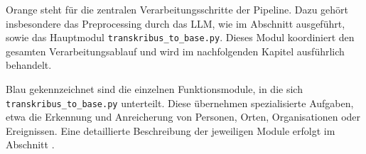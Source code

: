 \documentclass[12pt, a4paper, ngerman, bidi=default]{article}
\newcommand{\code}[1]{\colorbox{VeryLightGray}{\texttt{#1}}} %
\begin{document}
Orange steht für die zentralen Verarbeitungsschritte der Pipeline. Dazu gehört insbesondere das 
Preprocessing durch das LLM, wie im Abschnitt  
ausgeführt, sowie das Hauptmodul \code{transkribus\_to\_base.py}. Dieses Modul koordiniert den 
gesamten Verarbeitungsablauf und wird im nachfolgenden Kapitel  ausführlich behandelt.

Blau gekennzeichnet sind die einzelnen Funktionsmodule, in die sich \code{transkribus\_to\_base.py} 
unterteilt. Diese übernehmen spezialisierte Aufgaben, etwa die Erkennung und Anreicherung von Personen, 
Orten, Organisationen oder Ereignissen. Eine detaillierte Beschreibung der jeweiligen Module erfolgt im 
Abschnitt .


\vspace{0.9\baselineskip}
  \centering
\end{document}
